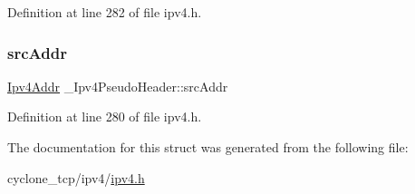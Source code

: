 Definition at line 282 of file ipv4.\+h.

\mbox{\label{struct__Ipv4PseudoHeader_a3f2e436731b26b12c65aa5666f990bec}} 
\subsubsection{\texorpdfstring{src\+Addr}{srcAddr}}
{\footnotesize\ttfamily \hyperlink{ipv4_8h_a411debb3d770caa0c06d3f73367da37f}{Ipv4\+Addr} \+\_\+\+Ipv4\+Pseudo\+Header\+::src\+Addr}



Definition at line 280 of file ipv4.\+h.



The documentation for this struct was generated from the following file\+:\begin{DoxyCompactItemize}
\item 
cyclone\+\_\+tcp/ipv4/\hyperlink{ipv4_8h}{ipv4.\+h}\end{DoxyCompactItemize}

